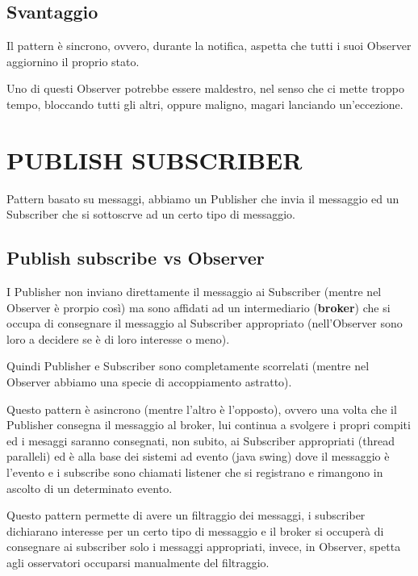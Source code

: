 \section{Svantaggio}

Il pattern è sincrono, ovvero, durante la notifica, aspetta che tutti i suoi Observer aggiornino il proprio stato.

Uno di questi Observer potrebbe essere maldestro, nel senso che ci mette troppo tempo, bloccando tutti gli altri, oppure maligno, magari lanciando un'eccezione.

\chapter{PUBLISH SUBSCRIBER}

Pattern basato su messaggi, abbiamo un Publisher che invia il messaggio ed un Subscriber che si sottoscrve ad un certo tipo di messaggio.

\section{Publish subscribe vs Observer}

I Publisher non inviano direttamente il messaggio ai Subscriber (mentre nel Observer è prorpio così) ma sono affidati ad un intermediario (\textbf{broker}) che si 
occupa di consegnare il messaggio al Subscriber appropriato (nell'Observer sono loro a decidere se è di loro interesse o meno).

Quindi Publisher e Subscriber sono completamente scorrelati (mentre nel Observer abbiamo una specie di accoppiamento astratto).

Questo pattern è asincrono (mentre l'altro è l'opposto), ovvero una volta che il Publisher consegna il messaggio al broker, lui continua a svolgere i propri compiti 
ed i mesaggi saranno consegnati, non subito, ai Subscriber appropriati (thread paralleli) ed è alla base dei sistemi ad evento (java swing) dove il messaggio è l'evento 
e i subscribe sono chiamati listener che si registrano e rimangono in ascolto di un determinato evento.

Questo pattern permette di avere un filtraggio dei messaggi, i subscriber dichiarano interesse per un certo tipo di messaggio e il broker si occuperà di consegnare ai 
subscriber solo i messaggi appropriati, invece, in Observer, spetta agli osservatori occuparsi manualmente del filtraggio.